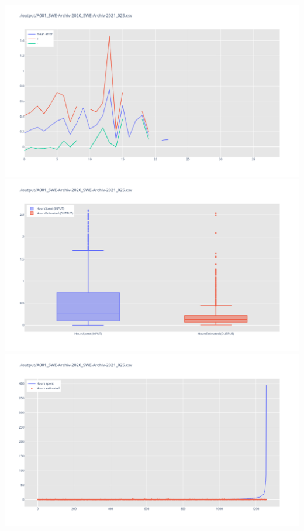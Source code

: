 \includegraphics[width=\textwidth]{Scripts/output/A001_SWE-Archiv-2020_SWE-Archiv-2021_025.csv.error_distribution.png}
\includegraphics[width=\textwidth]{Scripts/output/A001_SWE-Archiv-2020_SWE-Archiv-2021_025.csv.png}
\includegraphics[width=\textwidth]{Scripts/output/A001_SWE-Archiv-2020_SWE-Archiv-2021_025.csv.scatter.png}

